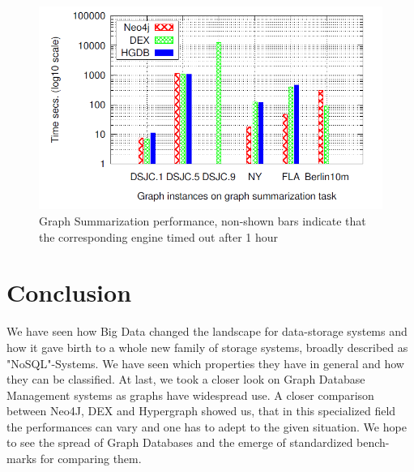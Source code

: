 \documentclass{acm_proc_article-sp}
\begin{document}
\begin{figure}[hbtp]
	\centering
	\includegraphics[scale=0.32]{summarization.png}
	\caption{Graph Summarization performance, non-shown bars indicate that
		the corresponding engine timed out after 1 hour\cite{comparision}}
\end{figure}

\section{Conclusion}

We have seen how Big Data changed the landscape for data-storage systems and how it gave birth to a whole new family of storage systems, broadly described as "NoSQL"-Systems. We have seen which properties they have in general and how they can be classified. At last, we took a closer look on Graph Database Management systems as graphs have widespread use. A closer comparison between Neo4J, DEX and Hypergraph showed us, that in this specialized field the performances can vary and one has to adept to the given situation. We hope to see the spread of Graph Databases and the emerge of standardized bench-marks for comparing them.


%

%
%
\end{document}
